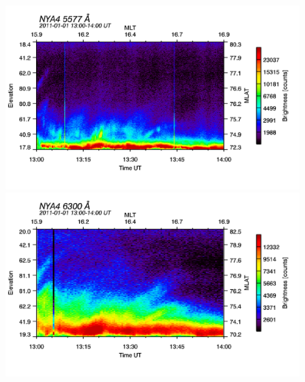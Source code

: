 \begin{figure}
\begin{minipage}{0.49\textwidth}
\includegraphics[width=1\linewidth]{Figures/Allsky/5577/nya4_20110101_1300_1400_5577_cal.png}
\end{minipage}
\begin{minipage}{0.49\textwidth}
\includegraphics[width=1\linewidth]{Figures/Allsky/6300/nya4_20110101_1300_1400_6300_cal.png}
\end{minipage}


\end{figure}
